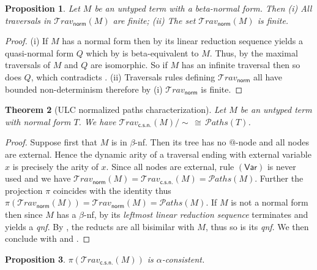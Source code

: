 \documentclass[xchauthor,chkrefs,GCNS,amsmath,amsthm,rotating,leaveRGB]{tcsg}
\theoremstyle{plain}
\newtheorem{theorem}{Theorem}[section]
\newtheorem{proposition}[theorem]{Proposition}
\theoremstyle{definition}
\newcommand\travset{\mathcal{T}\!rav}
\newcommand{\normalizing}{\mathsf{norm}}
\newcommand{\travsetnorm}{\travset_{\normalizing}}
\newcommand{\travsetscn}{\travset_{\mathsf{c.s.n.}}}
\def\structisomorphic{\cong}
\def\coresymbol{\pi}
\newcommand{\core}[1]{\coresymbol(#1)}
\newcommand{\pathset}{{\mathcal{P}aths}}
\begin{document}
\begin{proposition}\label{prop:ulc_travnorm_finite}
Let $M$ be an untyped term with a beta-normal form. Then (i) All traversals
in $\travsetnorm (M)$ are finite; (ii) The set $\travsetnorm (M)$ is finite.
\end{proposition}

\begin{proof}
(i) If $M$ has a normal form then by
 its linear
reduction sequence yields a quasi-normal form $Q$ which by
 is beta-equivalent to
$M$. Thus, by 
the maximal traversals of $M$ and $Q$ are isomorphic. So if $M$ has an
infinite traversal then so does $Q$, which contradicts
. (ii) Traversals
rules defining $\travsetnorm $ all have bounded non-determinism therefore by
(i) $\travsetnorm $ is finite.
\end{proof}

\begin{theorem}[ULC normalized paths characterization]\label{thm:path_charact_ulc}
Let $M$ be an untyped term with normal form $T$. We have $\travsetscn
(M)/{\sim } \, \structisomorphic \, \pathset (T)$.
\end{theorem}

\begin{proof}
Suppose first that $M$ is in $\beta $-nf. Then its tree has no $@$-node and
all nodes are external. Hence the dynamic arity of a traversal ending with
external variable $x$ is precisely the arity of $x$. Since all nodes are
external, rule $\mathsf{(Var)}$ is never used and we have $\travsetnorm (M) =
\travsetscn (M) = \pathset (M)$. Further the projection $\coresymbol $
coincides with the identity thus $\core{\travsetnorm (M)} = \travsetnorm (M)
= \pathset (M)$. If $M$ is not a normal form then since $M$ has a $\beta
$-nf, by  its
\emph{leftmost linear reduction sequence} terminates and yields a \emph{qnf}.
By , the
reducts are all bisimilar with $M$, thus so is its \emph{qnf}. We then
conclude with  and
.
\end{proof}

\begin{proposition}\label{prop:core_travsetnorm_alpha_consistent}
$\core{\travsetscn (M)}$ is $\alpha $-consistent.
\end{proposition}
\end{document}
